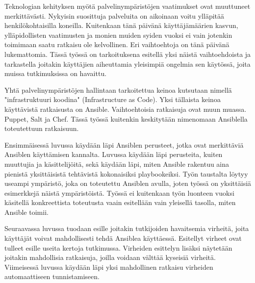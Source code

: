 Teknologian kehityksen myötä palvelinympäristöjen vaatimukset ovat muuttuneet merkittävästi.
Nykyisin suosittuja palveluita on aikoinaan voitu ylläpitää henkilökohtaisilla koneilla.
Kuitenkaan tänä päivänä käyttäjämäärien kasvun, ylläpidollisten vaatimusten ja monien muiden
syiden vuoksi ei vain jotenkin toimimaan saatu ratkaisu ole kelvollinen. Eri vaihtoehtoja on
tänä päivänä lukemattomia. Tässä työssä on tarkoituksena esitellä yksi näistä vaihtoehdoista
ja tarkastella joitakin käyttäjien aiheuttamia yleisimpiä ongelmia sen käytössä, joita muissa
tutkimuksissa on havaittu.

Yhtä palvelinympäristöjen hallintaan tarkoitettua keinoa kutsutaan nimellä "infrastruktuuri
koodina" (Infrastructure as Code). Yksi tällaista keinoa käyttävistä ratkaisusta on Ansible.
Vaihtoehtoisia ratkaisuja ovat muun muassa. Puppet, Salt ja Chef. Tässä työssä kuitenkin
keskitytään nimenomaan Ansiblella toteutettuun ratkaisuun.

Ensimmäisessä luvussa käydään läpi Ansiblen perusteet, jotka ovat merkittäviä Ansiblen
käyttämisen kannalta. Luvussa käydään läpi perusteita, kuiten muuttujia ja käsittelijöitä,
sekä käydään läpi, miten Ansible rakentuu aina pienistä yksittäisistä tehtävistä kokonaisiksi
playbookeiksi. Työn taustalta löytyy useampi ympäristö, joka on toteutettu Ansiblen avulla,
joten työssä on yksittäisiä esimerkkejä näistä ympäristöistä. Työssä ei kuitenkaan työn
luonteen vuoksi käsitellä konkreettista toteutusta vaain esitellään vain yleisellä tasolla,
miten Ansible toimii.

Seuraavassa luvussa tuodaan esille joitakin tutkijoiden havaitsemia virheitä, joita käyttäjät
voivat mahdollisesti tehdä Ansiblea käyttäessä. Esitellyt virheet ovat tulleet esille useita
kertoja tutkimussa. Virheiden esittelyn lisäksi näytetään joitakin mahdollisia ratkaisuja,
joilla voidaan välttää kyseisiä virheitä. Viimeisessä luvussa käydään läpi yksi mahdollinen
ratkaisu virheiden automaattiseen tunnistamiseen.
